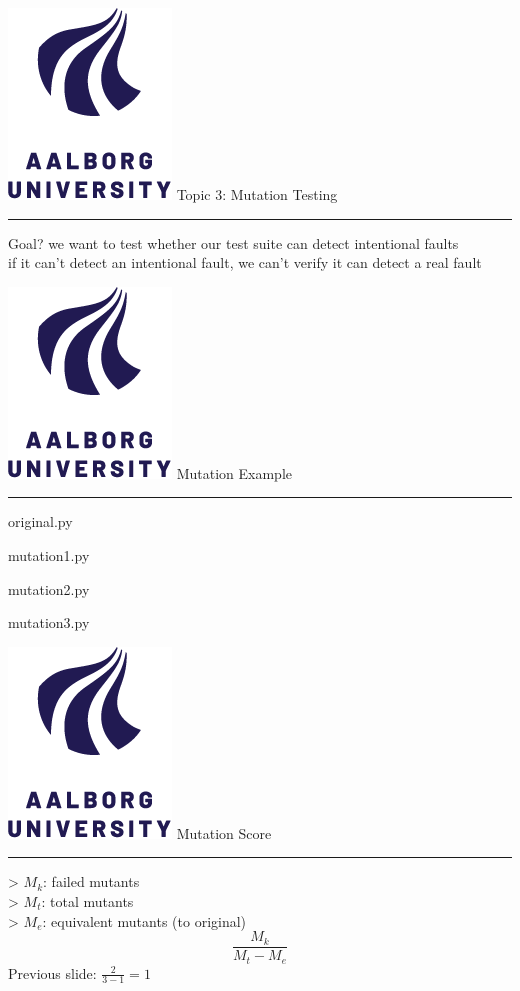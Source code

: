 \documentclass[aspectratio=1610,17pt,utf8]{beamer}
\newcommand{\mainframe}[1]{\color{blue} \includegraphics[width=.05\textwidth]{figures/aau.png} #1\\\hrule}
\newcommand{\mf}[1]{\mainframe{#1}}
\newcommand{\regularframe}[1]{\color{black}\includegraphics[width=.05\textwidth]{figures/aau.png} #1\\\hrule}
\newcommand{\rf}[1]{\regularframe{#1}}
\begin{document}

\begin{frame}{\mf{Topic 3: Mutation Testing}}
    Goal? we want to test whether our test suite can detect intentional faults\\
    if it can't detect an intentional fault, we can't verify it can detect a real fault
\end{frame}

\begin{frame}{\rf{Mutation Example}}
    \begin{minipage}{.45\textwidth}
        \begin{table}
            \tiny original.py
            
        \end{table}
    \end{minipage}
    \hspace{.05\textwidth}
    \begin{minipage}{.45\textwidth}
        \begin{table}
            \tiny mutation1.py
            
        \end{table}
    \end{minipage}
    
    \begin{minipage}{.45\textwidth}
        \begin{table}
            \tiny mutation2.py
            
        \end{table}
    \end{minipage}
    \hspace{.05\textwidth}
    \begin{minipage}{.45\textwidth}
        \begin{table}
            \tiny mutation3.py
            
        \end{table}
    \end{minipage}
\end{frame}

\begin{frame}{\rf{Mutation Score}}
    > $M_k$: failed mutants\\
    > $M_t$: total mutants\\
    > $M_e$: equivalent mutants (to original)\\
    \begin{equation}
        \frac{M_k}{M_t-M_e}
    \end{equation}
    Previous slide: $\frac{2}{3-1} = 1$
\end{frame}
\end{document}
